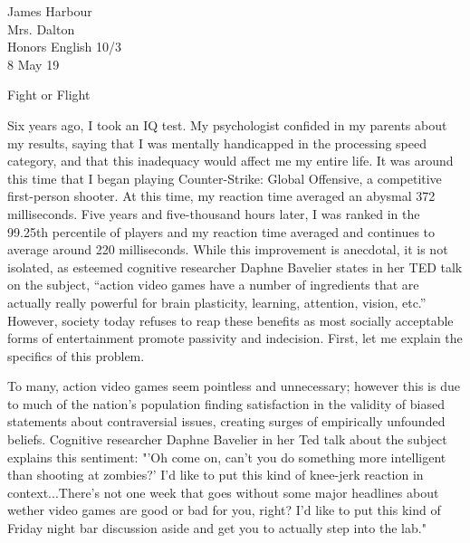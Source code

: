 \documentclass[12pt]{article}
\begin{document}
\begin{flushleft}

James Harbour \\
Mrs. Dalton \\
Honors English 10/3 \\
8 May 19 \\

\begin{center}
Fight or Flight
\end{center}

\setlength{\parindent}{0.5in}

\normalsize
Six years ago, I took an IQ test. My psychologist confided in my parents about my results, saying that I was mentally handicapped in the processing speed category, and that this inadequacy would affect me my entire life. It was around this time that I began playing Counter-Strike: Global Offensive, a competitive first-person shooter. At this time, my reaction time averaged an abysmal 372 milliseconds. Five years and five-thousand hours later, I was ranked in the 99.25th percentile of players and my reaction time averaged and continues to average around 220 milliseconds. While this improvement is anecdotal, it is not isolated, as esteemed cognitive researcher Daphne Bavelier states in her TED talk on the subject, “action video games have a number of ingredients that are actually really powerful for brain plasticity, learning, attention, vision, etc.” However, society today refuses to reap these benefits as most socially acceptable forms of entertainment promote passivity and indecision. First, let me explain the specifics of this problem.

To many, action video games seem pointless and unnecessary; however this is due to much of the nation's population finding satisfaction in the validity of biased statements about contraversial issues, creating surges of empirically unfounded beliefs. Cognitive researcher Daphne Bavelier in her Ted talk about the subject explains this sentiment: "'Oh come on, can't you do something more intelligent than shooting at zombies?' I'd like to put this kind of knee-jerk reaction in context...There's not one week that goes without some major headlines about wether video games are good or bad for you, right? I'd like to put this kind of Friday night bar discussion aside and get you to actually step into the lab."


\end{flushleft}
\end{document}
